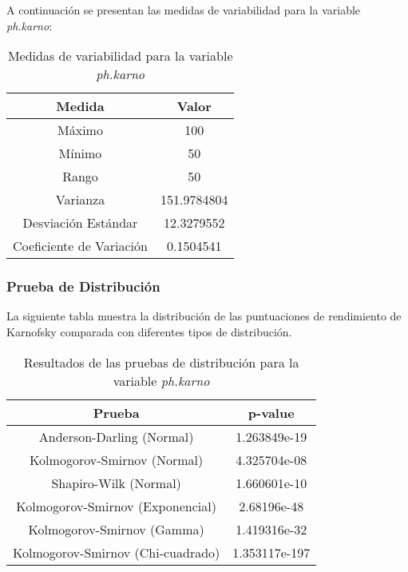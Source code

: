 \documentclass[a4paper,12pt]{article}
\begin{document}
A continuación se presentan las medidas de variabilidad para la variable \textit{ph.karno}:

\begin{table}[h!]
    \centering
    \begin{tabular}{|c|c|}
        \hline
        \textbf{Medida} & \textbf{Valor} \\
        \hline
        Máximo & 100 \\
        \hline
        Mínimo & 50 \\
        \hline
        Rango & 50 \\
        \hline
        Varianza & 151.9784804 \\
        \hline
        Desviación Estándar & 12.3279552 \\
        \hline
        Coeficiente de Variación & 0.1504541 \\
        \hline
    \end{tabular}
    \caption{Medidas de variabilidad para la variable \textit{ph.karno}}
    \label{tab:medidas_variabilidad_ph_karno}
\end{table}

\subsubsection*{Prueba de Distribución}

La siguiente tabla muestra la distribución de las puntuaciones de rendimiento de Karnofsky comparada con diferentes tipos de distribución.

\clearpage

\begin{table}[h!]
    \centering
    \begin{tabular}{|c|c|}
        \hline
        \textbf{Prueba} & \textbf{p-value} \\
        \hline
        Anderson-Darling (Normal) & 1.263849e-19 \\
        \hline
        Kolmogorov-Smirnov (Normal) & 4.325704e-08 \\
        \hline
        Shapiro-Wilk (Normal) & 1.660601e-10 \\
        \hline
        Kolmogorov-Smirnov (Exponencial) & 2.68196e-48 \\
        \hline
        Kolmogorov-Smirnov (Gamma) & 1.419316e-32 \\
        \hline
        Kolmogorov-Smirnov (Chi-cuadrado) & 1.353117e-197 \\
        \hline
    \end{tabular}
    \caption{Resultados de las pruebas de distribución para la variable \textit{ph.karno}}
    \label{tab:pruebas_distribucion_ph_karno}
\end{table}
\end{document}

